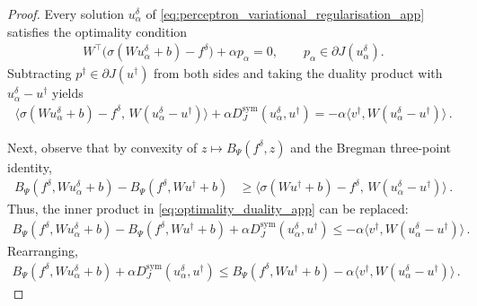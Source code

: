 \begin{proof}
Every solution $u_\alpha^\delta$ of \eqref{eq:perceptron_variational_regularisation_app} satisfies the optimality condition
\begin{align*}
    W^\top\big(\sigma(Wu_\alpha^\delta+b)-f^\delta\big)+\alpha p_\alpha=0, \qquad p_\alpha\in\partial J(u_\alpha^\delta).
\end{align*}
Subtracting $p^\dagger \in \partial J(u^\dagger)$ from both sides and taking the duality product with $u_\alpha^\delta - u^\dagger$ yields
\begin{align}
    \langle \sigma(Wu_\alpha^\delta+b)-f^\delta,\,W(u_\alpha^\delta-u^\dagger)\rangle + \alpha D_J^{\mathrm{sym}}(u_\alpha^\delta,u^\dagger) = -\alpha\langle v^\dagger, W(u_\alpha^\delta-u^\dagger)\rangle \, .\label{eq:optimality_duality_app}
\end{align}

Next, observe that by convexity of $z\mapsto B_\Psi(f^\delta,z)$ and the Bregman three-point identity,
\begin{align*}
    B_\Psi(f^\delta,Wu_\alpha^\delta+b) - B_\Psi(f^\delta,Wu^\dagger+b) &\ge \langle \sigma(Wu^\dagger+b)-f^\delta,\,W(u_\alpha^\delta-u^\dagger)\rangle \, .
\end{align*}
Thus, the inner product in \eqref{eq:optimality_duality_app} can be replaced:
\begin{align*}
    B_\Psi(f^\delta,Wu_\alpha^\delta+b) - B_\Psi(f^\delta,Wu^\dagger+b) + \alpha D_J^{\mathrm{sym}}(u_\alpha^\delta,u^\dagger) \le -\alpha\langle v^\dagger, W(u_\alpha^\delta-u^\dagger)\rangle \, .
\end{align*}
Rearranging,
\begin{align*}
    B_\Psi(f^\delta,Wu_\alpha^\delta+b) + \alpha D_J^{\mathrm{sym}}(u_\alpha^\delta,u^\dagger) \le B_\Psi(f^\delta,Wu^\dagger+b) - \alpha\langle v^\dagger, W(u_\alpha^\delta-u^\dagger)\rangle \, .
\end{align*}


\end{proof}
